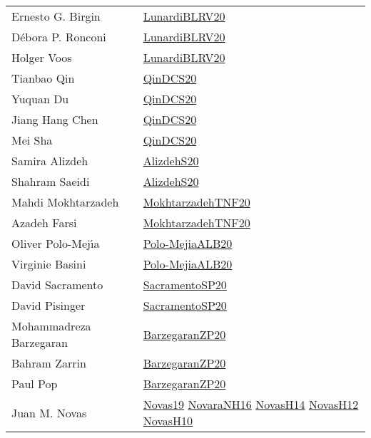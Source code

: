 {\begin{longtable}{p{4cm}p{15cm}}
Ernesto G. Birgin & \href{articles/LunardiBLRV20.pdf}{LunardiBLRV20}\cite{LunardiBLRV20} \\
D{\'{e}}bora P. Ronconi & \href{articles/LunardiBLRV20.pdf}{LunardiBLRV20}\cite{LunardiBLRV20} \\
Holger Voos & \href{articles/LunardiBLRV20.pdf}{LunardiBLRV20}\cite{LunardiBLRV20} \\
Tianbao Qin & \href{articles/QinDCS20.pdf}{QinDCS20}\cite{QinDCS20} \\
Yuquan Du & \href{articles/QinDCS20.pdf}{QinDCS20}\cite{QinDCS20} \\
Jiang Hang Chen & \href{articles/QinDCS20.pdf}{QinDCS20}\cite{QinDCS20} \\
Mei Sha & \href{articles/QinDCS20.pdf}{QinDCS20}\cite{QinDCS20} \\
Samira Alizdeh & \href{articles/AlizdehS20.pdf}{AlizdehS20}\cite{AlizdehS20} \\
Shahram Saeidi & \href{articles/AlizdehS20.pdf}{AlizdehS20}\cite{AlizdehS20} \\
Mahdi Mokhtarzadeh & \href{articles/MokhtarzadehTNF20.pdf}{MokhtarzadehTNF20}\cite{MokhtarzadehTNF20} \\
Azadeh Farsi & \href{articles/MokhtarzadehTNF20.pdf}{MokhtarzadehTNF20}\cite{MokhtarzadehTNF20} \\
Oliver Polo{-}Mej{\'{\i}}a & \href{articles/Polo-MejiaALB20.pdf}{Polo-MejiaALB20}\cite{Polo-MejiaALB20} \\
Virginie Basini & \href{articles/Polo-MejiaALB20.pdf}{Polo-MejiaALB20}\cite{Polo-MejiaALB20} \\
David Sacramento & \href{articles/SacramentoSP20.pdf}{SacramentoSP20}\cite{SacramentoSP20} \\
David Pisinger & \href{articles/SacramentoSP20.pdf}{SacramentoSP20}\cite{SacramentoSP20} \\
Mohammadreza Barzegaran & \href{papers/BarzegaranZP20.pdf}{BarzegaranZP20}\cite{BarzegaranZP20} \\
Bahram Zarrin & \href{papers/BarzegaranZP20.pdf}{BarzegaranZP20}\cite{BarzegaranZP20} \\
Paul Pop & \href{papers/BarzegaranZP20.pdf}{BarzegaranZP20}\cite{BarzegaranZP20} \\
Juan M. Novas & \href{articles/Novas19.pdf}{Novas19}\cite{Novas19} \href{articles/NovaraNH16.pdf}{NovaraNH16}\cite{NovaraNH16} \href{articles/NovasH14.pdf}{NovasH14}\cite{NovasH14} \href{articles/NovasH12.pdf}{NovasH12}\cite{NovasH12} \href{articles/NovasH10.pdf}{NovasH10}\cite{NovasH10} \\

\end{longtable}}
